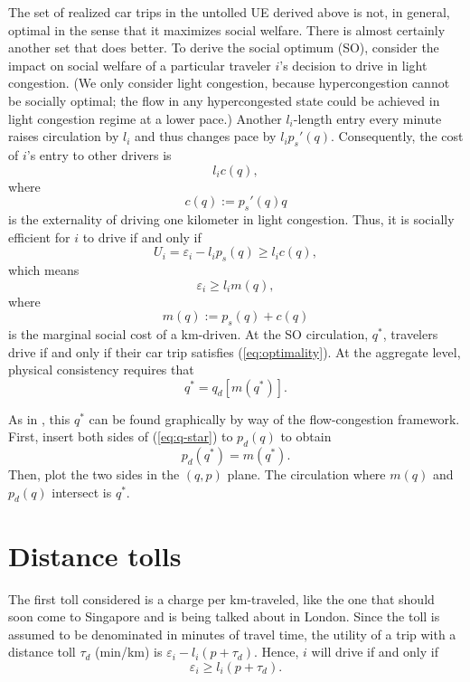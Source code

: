 \documentclass[preprint,authoryear]{elsarticle}
\newcommand{\taud}{\tau_d}
\newcommand{\ve}{\varepsilon}
\begin{document}
The set of realized car trips in the untolled UE derived above is not, in general, optimal in the sense that it maximizes social welfare. There is almost certainly another set that does better. To derive the social optimum (SO), consider the impact on social welfare of a particular traveler $i$'s decision to drive in light congestion. (We only consider light congestion, because hypercongestion cannot be socially optimal; the flow in any hypercongested state could be achieved in light congestion regime at a lower pace.) Another $l_i$-length entry every minute raises circulation by $l_i$ and thus changes pace by $l_i p_s'(q)$. Consequently, the cost of $i$'s entry to other drivers is
$$l_i  c(q),$$
where 
\begin{equation}
	c(q):= p_s'(q)q
\end{equation}
is the externality of driving one kilometer in light congestion. Thus, it is socially efficient for $i$ to drive if and only if 
\begin{equation}
	U_i = \ve_i - l_i p_s(q) \geq l_i c(q),
\end{equation}
which means
\begin{equation}\label{eq:optimality}
	\ve_i  \geq l_i m(q),
\end{equation}
where
\begin{equation}
	m(q):=p_s(q)+c(q)
\end{equation} 
is the marginal social cost of a km-driven. At the SO circulation, $q^*$, travelers drive if and only if their car trip satisfies (\ref{eq:optimality}). At the aggregate level, physical consistency requires that
\begin{equation}\label{eq:q-star}
	 q^*= q_d[m(q^*)].
\end{equation}

As in \citet{Walters1961}, this $q^*$ can be found graphically by way of the flow-congestion framework. First, insert both sides of (\ref{eq:q-star}) to $p_d(q)$ to obtain
\begin{equation}
	p_d(q^*) = m(q^*).
\end{equation}
Then, plot the two sides in the $(q,p)$ plane. The circulation where $m(q)$ and $p_d(q)$ intersect is $q^*$.

\section{Distance tolls}
\label{sec:distance_tolls}

The first toll considered is a charge per km-traveled, like the one that should soon come to Singapore and is being talked about in London. Since the toll is assumed to be denominated in minutes of travel time, the utility of a trip with a distance toll $\taud$ (min/km) is $\ve_i - l_i(p + \taud)$. Hence, $i$ will drive if and only if
\begin{equation}\label{eq:distance-toll}
	\ve_i \geq l_i (p+\taud).
\end{equation}
\end{document}
